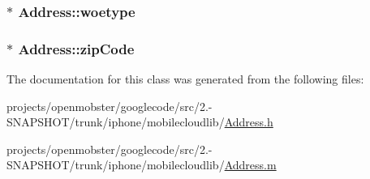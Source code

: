 \label{interface_address_a0d5eea8ea063877691868ba2912ea792}
\hypertarget{interface_address_a6a0eb464fe79e147e913afa187992780}{
\subsubsection[{woetype}]{ $\ast$ \-Address\-::woetype}}
\label{interface_address_a6a0eb464fe79e147e913afa187992780}
\hypertarget{interface_address_a1170e5f1fafb1f2a4b3d0ec23e0dca16}{
\subsubsection[{zip\-Code}]{ $\ast$ \-Address\-::zip\-Code}}
\label{interface_address_a1170e5f1fafb1f2a4b3d0ec23e0dca16}


\-The documentation for this class was generated from the following files\-:\begin{DoxyCompactItemize}
\item 
projects/openmobster/googlecode/src/2.-\/\-S\-N\-A\-P\-S\-H\-O\-T/trunk/iphone/mobilecloudlib/\hyperlink{_address_8h}{\-Address.\-h}\item 
projects/openmobster/googlecode/src/2.-\/\-S\-N\-A\-P\-S\-H\-O\-T/trunk/iphone/mobilecloudlib/\hyperlink{_address_8m}{\-Address.\-m}\end{DoxyCompactItemize}
